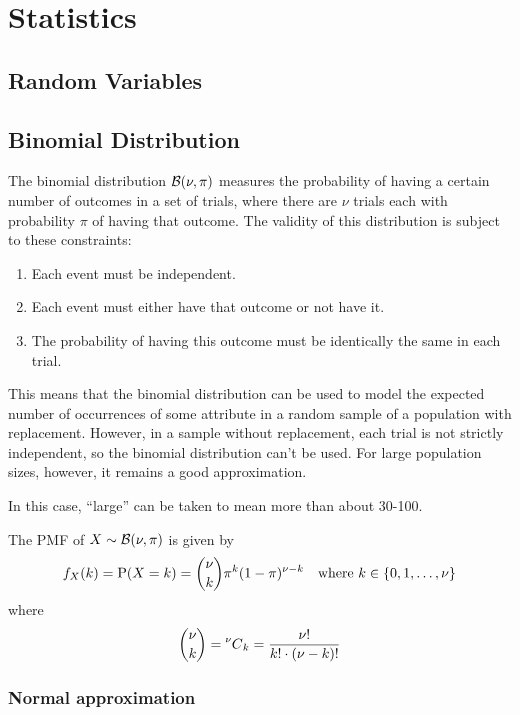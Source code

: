 \section{Statistics}

\subsection{Random Variables}

\subsection{Binomial Distribution}


The binomial distribution \(\operatorname{\mathcal{B}}(\nu, \pi)\) measures the probability
of having a certain number of outcomes in a set of trials,  where there are
\(\nu\) trials each with probability \(\pi\) of having that outcome.
The validity of this distribution is subject to these constraints:
\begin{enumerate}
\item Each event must be independent.
\item Each event must either have that outcome or not have it.
\item The probability of having this outcome must be identically the same in
      each trial.
\end{enumerate}
This means that the binomial distribution can be used to model the expected
number of occurrences of some attribute in a random sample of a population
with replacement. However, in a sample without replacement, each trial is
not strictly independent, so the binomial distribution can't be used. For
large population sizes, however, it remains a good approximation.

In this case, ``large'' can be taken to mean more than about 30-100.

The PMF of \(X \sim \operatorname{\mathcal{B}}(\nu, \pi)\) is given by
\begin{equation*}
f_X(k) = \operatorname{\mathrm P}(X = k) = \binom \nu k \pi^k (1 - \pi)^{\nu - k}
    \quad \text{where \(k \in \set{0, 1, \dotsc, \nu}\)}
\end{equation*}
where
\begin{equation*}
\binom \nu k = \prescript{\nu\mkern-0.5mu}{}C_{k} = \frac{\nu!}{k!\cdot (\nu - k)!}
\end{equation*}

\subsubsection{Normal approximation}

